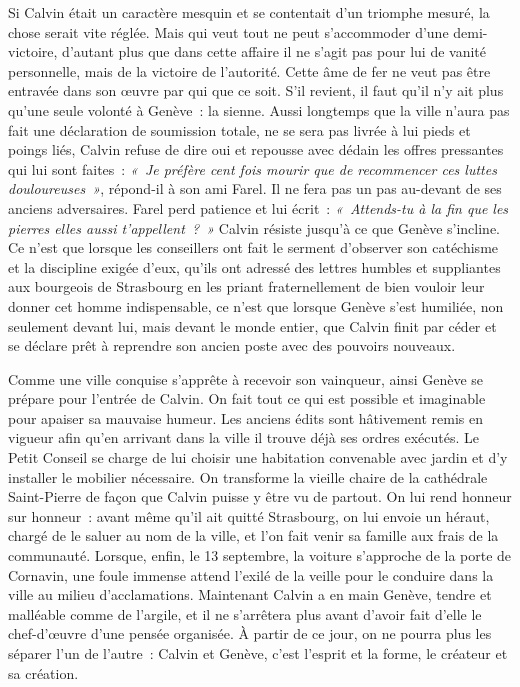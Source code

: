 \documentclass[french,twoside]{book} %
\newcommand\chapterclose{} %
\begin{document}
Si Calvin était un caractère mesquin et se contentait d’un triomphe mesuré, la chose serait vite réglée. Mais qui veut tout ne peut s’accommoder d’une demi-victoire, d’autant plus que dans cette affaire il ne s’agit pas pour lui de vanité personnelle, mais de la victoire de l’autorité. Cette âme de fer ne veut pas être entravée dans son œuvre par qui que ce soit. S’il revient, il faut qu’il n’y ait plus qu’une seule volonté à Genève : la sienne. Aussi longtemps que la ville n’aura pas fait une déclaration de soumission totale, ne se sera pas livrée à lui pieds et poings liés, Calvin refuse de dire oui et repousse avec dédain les offres pressantes qui lui sont faites : \emph{« Je préfère cent fois mourir que de recommencer ces luttes douloureuses »}, répond-il à son ami Farel. Il ne fera pas un pas au-devant de ses anciens adversaires. Farel perd patience et lui écrit : \emph{« Attends-tu à la fin que les pierres elles aussi t’appellent ? »} Calvin résiste jusqu’à ce que Genève s’incline. Ce n’est que lorsque les conseillers ont fait le serment d’observer son catéchisme et la discipline exigée d’eux, qu’ils ont adressé des lettres humbles et suppliantes aux bourgeois de Strasbourg en les priant fraternellement de bien vouloir leur donner cet homme indispensable, ce n’est que lorsque Genève s’est humiliée, non seulement devant lui, mais devant le monde entier, que Calvin finit par céder et se déclare prêt à reprendre son ancien poste avec des pouvoirs nouveaux.\par
Comme une ville conquise s’apprête à recevoir son vainqueur, ainsi Genève se prépare pour l’entrée de Calvin. On fait tout ce qui est possible et imaginable pour apaiser sa mauvaise humeur. Les anciens édits sont hâtivement remis en vigueur afin qu’en arrivant dans la ville il trouve déjà ses ordres exécutés. Le Petit Conseil se charge de lui choisir une habitation convenable avec jardin et d’y installer le mobilier nécessaire. On transforme la vieille chaire de la cathédrale Saint-Pierre de façon que Calvin puisse y être vu de partout. On lui rend honneur sur honneur : avant même qu’il ait quitté Strasbourg, on lui envoie un héraut, chargé de le saluer au nom de la ville, et l’on fait venir sa famille aux frais de la communauté. Lorsque, enfin, le 13 septembre, la voiture s’approche de la porte de Cornavin, une foule immense attend l’exilé de la veille pour le conduire dans la ville au milieu d’acclamations. Maintenant Calvin a en main Genève, tendre et malléable comme de l’argile, et il ne s’arrêtera plus avant d’avoir fait d’elle le chef-d’œuvre d’une pensée organisée. À partir de ce jour, on ne pourra plus les séparer l’un de l’autre : Calvin et Genève, c’est l’esprit et la forme, le créateur et sa création.
\chapterclose
\end{document}

